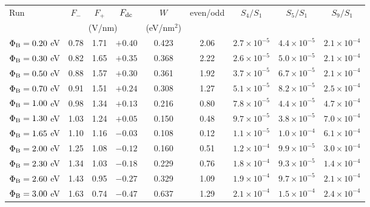 \begin{tabular}{lcccccccc}
\hline\hline
Run & $F_-$ & $F_+$ & $F_{\rm dc}$ & $W$ & even/odd & $S_4/S_1$ & $S_5/S_1$ & $S_9/S_1$ \\
 & \multicolumn{3}{c}{(V/nm)} & (eV/nm$^2$) & & & & \\
\hline
$\Phi_{\rm B}=0.20$ eV & 0.78 & 1.71 & $+0.40$ & 0.423 & 2.06 & $2.7\times10^{-5}$ & $4.4\times10^{-5}$ & $2.1\times10^{-4}$ \\
$\Phi_{\rm B}=0.30$ eV & 0.82 & 1.65 & $+0.35$ & 0.368 & 2.22 & $2.6\times10^{-5}$ & $5.0\times10^{-5}$ & $2.1\times10^{-4}$ \\
$\Phi_{\rm B}=0.50$ eV & 0.88 & 1.57 & $+0.30$ & 0.361 & 1.92 & $3.7\times10^{-5}$ & $6.7\times10^{-5}$ & $2.1\times10^{-4}$ \\
$\Phi_{\rm B}=0.70$ eV & 0.91 & 1.51 & $+0.24$ & 0.308 & 1.27 & $5.1\times10^{-5}$ & $8.2\times10^{-5}$ & $2.5\times10^{-4}$ \\
$\Phi_{\rm B}=1.00$ eV & 0.98 & 1.34 & $+0.13$ & 0.216 & 0.80 & $7.8\times10^{-5}$ & $4.4\times10^{-5}$ & $4.7\times10^{-4}$ \\
$\Phi_{\rm B}=1.30$ eV & 1.03 & 1.24 & $+0.05$ & 0.150 & 0.48 & $9.7\times10^{-5}$ & $3.8\times10^{-5}$ & $7.0\times10^{-4}$ \\
$\Phi_{\rm B}=1.65$ eV & 1.10 & 1.16 & $-0.03$ & 0.108 & 0.12 & $1.1\times10^{-5}$ & $1.0\times10^{-4}$ & $6.1\times10^{-4}$ \\
$\Phi_{\rm B}=2.00$ eV & 1.25 & 1.08 & $-0.12$ & 0.160 & 0.51 & $1.2\times10^{-4}$ & $9.9\times10^{-5}$ & $3.0\times10^{-4}$ \\
$\Phi_{\rm B}=2.30$ eV & 1.34 & 1.03 & $-0.18$ & 0.229 & 0.76 & $1.8\times10^{-4}$ & $9.3\times10^{-5}$ & $1.4\times10^{-4}$ \\
$\Phi_{\rm B}=2.60$ eV & 1.43 & 0.95 & $-0.27$ & 0.329 & 1.09 & $1.9\times10^{-4}$ & $9.7\times10^{-5}$ & $2.1\times10^{-4}$ \\
$\Phi_{\rm B}=3.00$ eV & 1.63 & 0.74 & $-0.47$ & 0.637 & 1.29 & $2.1\times10^{-4}$ & $1.5\times10^{-4}$ & $2.4\times10^{-4}$ \\
\hline\hline
\end{tabular}
